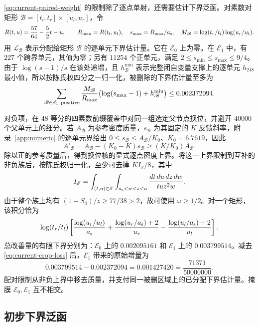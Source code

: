 \eqref{eq:current-paired-weight} 的限制除了逐点单射，还需要估计下界泛函。对素数对矩形 $\mathscr B=[t_l,t_r]\times[u_l,u_r]$，令
\[
 R(t,u)=\frac{57}{64}-\frac52t-u,\qquad
 R_{\max}=R(t_l,u_l),\quad s_{\max}=R_{\max}/{a_{\rm s}},\quad
 M_{\mathscr B}=\log(t_r/t_l)\log(u_r/u_l).
\]
用 $\mathcal L_{\mathscr B}$ 表示分配给矩形 $\mathscr B$ 的逐单元下界估计量。它在 $\mathscr E_0$ 上为零。在 $\mathscr E_1$ 中，有 $227$ 个跨界单元，其值为零；另有 $11254$ 个正单元，满足 $2\le s_{\min}\le s_{\max}\le9/4$。由于 $\log(s-1)/s$ 在该处递增，且 $h_{\mathscr B}^{\min}$ 表示完整闭自变量支撑上的逐单元 $h_{248}$ 最小值，所以按陈氏权四分之一归一化，被删除的下界估计量至多为
\begin{equation}
 \sum_{\mathscr B\in \mathscr E_1\ {\rm positive}}
       \frac{M_{\mathscr B}}{R_{\max}}\bigl(\log(s_{\max}-1)+h_{\mathscr B}^{\min}\bigr)
       \le 0.002372094.
 \label{eq:current-crop-loss}
\end{equation}

对负项，在 $48$ 等分的四素数前缀覆盖中对同一组选定父节点换位，并避开 $40000$ 个父单元上的细分。若 $A_{\mathscr B}$ 为参考密度质量，$s_{\mathscr B}$ 为其固定的 $K$ 反馈斜率，附录~\ref{app:numeric} 的逐单元界给出 $0\le s_{\mathscr B}\le A_{\mathscr B}/K_0$、$K_0=6.7619$，因此
\[
 A'_{\mathscr B}=A_{\mathscr B}-(K_0-K)s_{\mathscr B}\ge(K/K_0)A_{\mathscr B}.
\]
除以正的参考质量后，得到换位核的显式逐点密度上界。将这一上界限制到互补的非负族后，按陈氏权归一化，至少可去掉 $KI_{\mathscr E}/8$，其中
\begin{equation}
 I_{\mathscr E}=\int_{(t,u)\in \mathscr E}\int_{{a_{\rm s}}<w<z<u}
                      \frac{dt\,du\,dz\,dw}{tu z^2w}.
 \label{eq:current-crop-integral}
\end{equation}
由于整个族上均有 $(1-S_4)/z\ge77/38>2$，故可使用 $\omega\ge1/2$。对一个矩形，该积分恰为
\[
 \log(t_r/t_l)\left[
 \frac{\log(u_r/u_l)}{a_{\rm s}}+\frac{\log(u_r/{a_{\rm s}})+2}{u_r}
                         -\frac{\log(u_l/{a_{\rm s}})+2}{u_l}\right].
\]
总改善量的有限下界分别为：$\mathscr E_0$ 上的 $0.002095161$ 和 $\mathscr E_1$ 上的 $0.003799514$。减去 \eqref{eq:current-crop-loss} 后，$\mathscr E_1$ 带来的原始增量为
\begin{equation}
          0.003799514-0.002372094
             =0.001427420=\frac{71371}{50000000}.
 \label{eq:current-new-crop-gain}
\end{equation}
配对限制从非负上界中移去质量，并支付同一被删区域上的已分配下界估计量。掩膜 $\mathscr E_0,\mathscr E_1$ 互不相交。

\subsection{初步下界泛函}

